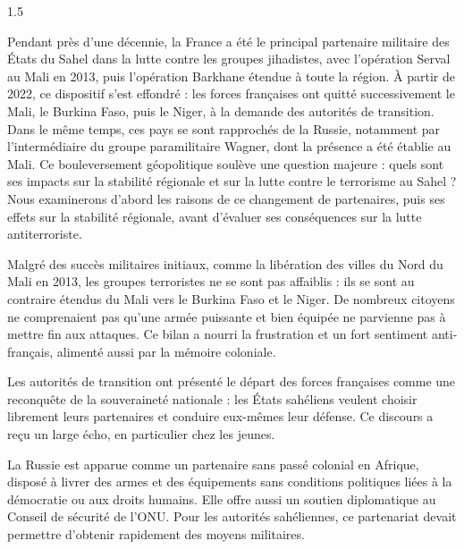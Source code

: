 \documentclass[12pt]{article}
\begin{document}
\begin{spacing}{1.5}


Pendant près d'une décennie, la France a été le principal partenaire militaire des États du Sahel dans la lutte contre les groupes jihadistes, avec l'opération Serval au Mali en 2013, puis l'opération Barkhane étendue à toute la région. À partir de 2022, ce dispositif s'est effondré : les forces françaises ont quitté successivement le Mali, le Burkina Faso, puis le Niger, à la demande des autorités de transition. Dans le même temps, ces pays se sont rapprochés de la Russie, notamment par l'intermédiaire du groupe paramilitaire Wagner, dont la présence a été établie au Mali. Ce bouleversement géopolitique soulève une question majeure : quels sont ses impacts sur la stabilité régionale et sur la lutte contre le terrorisme au Sahel ? Nous examinerons d'abord les raisons de ce changement de partenaires, puis ses effets sur la stabilité régionale, avant d'évaluer ses conséquences sur la lutte antiterroriste.


Malgré des succès militaires initiaux, comme la libération des villes du Nord du Mali en 2013, les groupes terroristes ne se sont pas affaiblis : ils se sont au contraire étendus du Mali vers le Burkina Faso et le Niger. De nombreux citoyens ne comprenaient pas qu'une armée puissante et bien équipée ne parvienne pas à mettre fin aux attaques. Ce bilan a nourri la frustration et un fort sentiment anti-français, alimenté aussi par la mémoire coloniale.

Les autorités de transition ont présenté le départ des forces françaises comme une reconquête de la souveraineté nationale : les États sahéliens veulent choisir librement leurs partenaires et conduire eux-mêmes leur défense. Ce discours a reçu un large écho, en particulier chez les jeunes.

La Russie est apparue comme un partenaire sans passé colonial en Afrique, disposé à livrer des armes et des équipements sans conditions politiques liées à la démocratie ou aux droits humains. Elle offre aussi un soutien diplomatique au Conseil de sécurité de l'ONU. Pour les autorités sahéliennes, ce partenariat devait permettre d'obtenir rapidement des moyens militaires.


\end{spacing}
\end{document}
